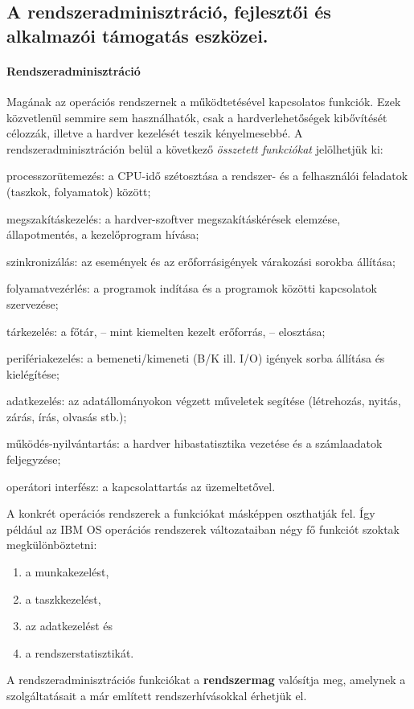 \subsection{A rendszeradminisztráció, fejlesztői és alkalmazói támogatás eszközei.}
\paragraph{Rendszeradminisztráció}
Magának az operációs rendszernek a működtetésével kapcsolatos funkciók. Ezek közvetlenül semmire sem használhatók, csak a hardverlehetőségek kibővítését célozzák, illetve a hardver kezelését teszik kényelmesebbé. A rendszeradminisztráción belül a következő \emph{összetett funkciókat} jelölhetjük ki:
\begin{enumdescript}
	\item[processzorütemezés:] a CPU-idő szétosztása a rendszer- és a felhasználói feladatok
	(taszkok, folyamatok) között;
	\item[megszakításkezelés:] a hardver-szoftver megszakításkérések elemzése, állapotmentés,
	a kezelőprogram hívása;
	\item[szinkronizálás:] az események és az erőforrásigények várakozási sorokba állítása;
	\item[folyamatvezérlés:] a programok indítása és a programok közötti kapcsolatok
	szervezése;
	\item[tárkezelés:] a főtár, -- mint kiemelten kezelt erőforrás, -- elosztása;
	\item[perifériakezelés:] a bemeneti/kimeneti (B/K ill. I/O) igények sorba állítása és
	kielégítése;
	\item[adatkezelés:] az adatállományokon végzett műveletek segítése (létrehozás, nyitás,
	zárás, írás, olvasás stb.);
	\item[működés-nyilvántartás:] a hardver hibastatisztika vezetése és a számlaadatok
	feljegyzése;
	\item[operátori interfész:] a kapcsolattartás az üzemeltetővel.
\end{enumdescript}
A konkrét operációs rendszerek a funkciókat másképpen oszthatják fel. Így például az IBM OS operációs rendszerek változataiban négy fő funkciót szoktak megkülönböztetni:
\begin{enumerate}
	\item a munkakezelést,
	\item a taszkkezelést,
	\item az adatkezelést és
	\item a rendszerstatisztikát.
\end{enumerate}
A rendszeradminisztrációs funkciókat a \textbf{rendszermag} valósítja meg, amelynek a szolgáltatásait a már említett rendszerhívásokkal érhetjük el.

